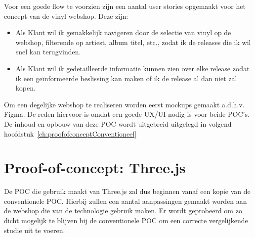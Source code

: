 Voor een goede flow te voorzien zijn een aantal user stories opgemaakt voor het concept van de vinyl webshop. Deze zijn:

\begin{itemize}
	\item Als Klant wil ik gemakkelijk navigeren door de selectie van vinyl op de webshop, filterende op artiest, album titel, etc., zodat ik de releases die ik wil snel kan terugvinden.
	\item Als Klant wil ik gedetailleerde informatie kunnen zien over elke release zodat ik een geïnformeerde beslissing kan maken of ik de release al dan niet zal kopen.
\end{itemize}

Om een degelijke webshop te realiseren worden eerst mockups gemaakt a.d.h.v. Figma. De reden hiervoor is omdat een goede UX/UI nodig is voor beide POC's. De inhoud en opbouw van deze POC wordt uitgebreid uitgelegd in volgend hoofdstuk~\ref{ch:proofofconceptConventioneel}

\section{Proof-of-concept: Three.js}

De POC die gebruik maakt van Three.js zal dus beginnen vanaf een kopie van de conventionele POC. Hierbij zullen een aantal aanpassingen gemaakt worden aan de webshop die van de technologie gebruik maken. Er wordt geprobeerd om zo dicht mogelijk te blijven bij de conventionele POC om een correcte vergelijkende studie uit te voeren.
